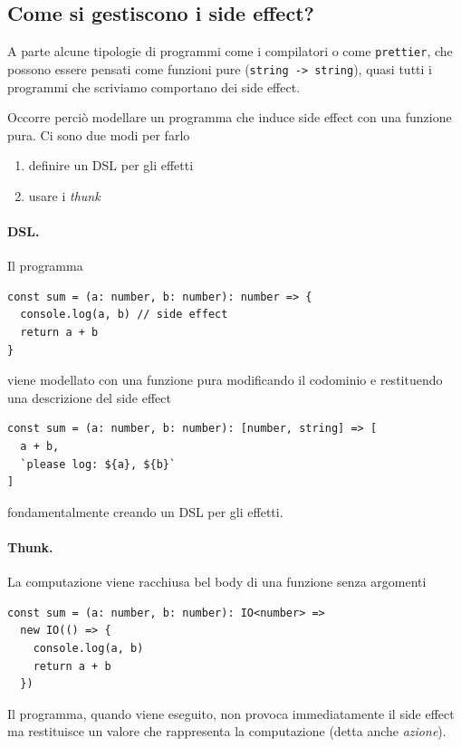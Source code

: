\documentclass[12pt]{article}
\begin{document}
\subsection{Come si gestiscono i side effect?}

A parte alcune tipologie di programmi come i compilatori o come \texttt{prettier}, che possono essere pensati come funzioni pure (\texttt{string -> string}),
quasi tutti i programmi che scriviamo comportano dei side effect.

Occorre perciò modellare un programma che induce side effect con una funzione pura. Ci sono due modi per farlo

\begin{enumerate}
  \item definire un DSL per gli effetti
  \item usare i \emph{thunk}
\end{enumerate}

\paragraph{DSL.} Il programma

\begin{verbatim}
const sum = (a: number, b: number): number => {
  console.log(a, b) // side effect
  return a + b
}
\end{verbatim}

viene modellato con una funzione pura modificando il codominio e restituendo una descrizione del side effect

\begin{verbatim}
const sum = (a: number, b: number): [number, string] => [
  a + b,
  `please log: ${a}, ${b}`
]
\end{verbatim}

fondamentalmente creando un DSL per gli effetti.

\paragraph{Thunk.} La computazione viene racchiusa bel body di una funzione senza argomenti

\begin{verbatim}
const sum = (a: number, b: number): IO<number> =>
  new IO(() => {
    console.log(a, b)
    return a + b
  })
\end{verbatim}

Il programma, quando viene eseguito, non provoca immediatamente il side effect ma restituisce un valore che rappresenta la computazione
(detta anche \emph{azione}).
\end{document}
